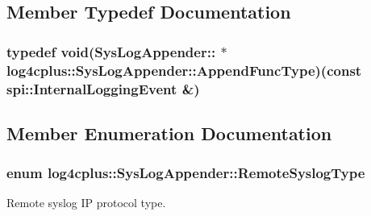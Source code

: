 \subsection{Member Typedef Documentation}
\hypertarget{classlog4cplus_1_1SysLogAppender_a60a3cdf1a9574897b146a9349f0016ab}{
\subsubsection[{Append\-Func\-Type}]{\setlength{\rightskip}{0pt plus 5cm}typedef void(Sys\-Log\-Appender\-:: $\ast$  log4cplus\-::\-Sys\-Log\-Appender\-::\-Append\-Func\-Type)(const {\bf spi\-::\-Internal\-Logging\-Event} \&)\hspace{0.3cm}{\ttfamily [protected]}}}\label{classlog4cplus_1_1SysLogAppender_a60a3cdf1a9574897b146a9349f0016ab}


\subsection{Member Enumeration Documentation}
\hypertarget{classlog4cplus_1_1SysLogAppender_a1c7b4852672b2e8fe3c00c215c34d407}{
\subsubsection[{Remote\-Syslog\-Type}]{\setlength{\rightskip}{0pt plus 5cm}enum {\bf log4cplus\-::\-Sys\-Log\-Appender\-::\-Remote\-Syslog\-Type}}}\label{classlog4cplus_1_1SysLogAppender_a1c7b4852672b2e8fe3c00c215c34d407}


Remote syslog I\-P protocol type. 

